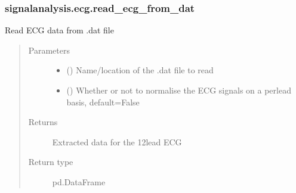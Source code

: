 \documentclass[letterpaper,10pt,english]{sphinxmanual}
\begin{document}
\subsubsection{signalanalysis.ecg.read\_ecg\_from\_dat}
\label{\detokenize{_autosummary/signalanalysis.ecg.read_ecg_from_dat:signalanalysis-ecg-read-ecg-from-dat}}\label{\detokenize{_autosummary/signalanalysis.ecg.read_ecg_from_dat::doc}}

\begin{fulllineitems}
\label{\detokenize{_autosummary/signalanalysis.ecg.read_ecg_from_dat:signalanalysis.ecg.read_ecg_from_dat}}
\sphinxAtStartPar
Read ECG data from .dat file
\begin{quote}\begin{description}
\item[{Parameters}] \leavevmode\begin{itemize}
\item {} 
\sphinxAtStartPar
{} () \textendash{} Name/location of the .dat file to read

\item {} 
\sphinxAtStartPar
{} (\sphinxstyleliteralemphasis{\sphinxupquote{, }}) \textendash{} Whether or not to normalise the ECG signals on a per\sphinxhyphen{}lead basis, default=False

\end{itemize}

\item[{Returns}] \leavevmode
\sphinxAtStartPar
{} \textendash{} Extracted data for the 12\sphinxhyphen{}lead ECG

\item[{Return type}] \leavevmode
\sphinxAtStartPar
pd.DataFrame

\end{description}\end{quote}

\end{fulllineitems}
\end{document}
